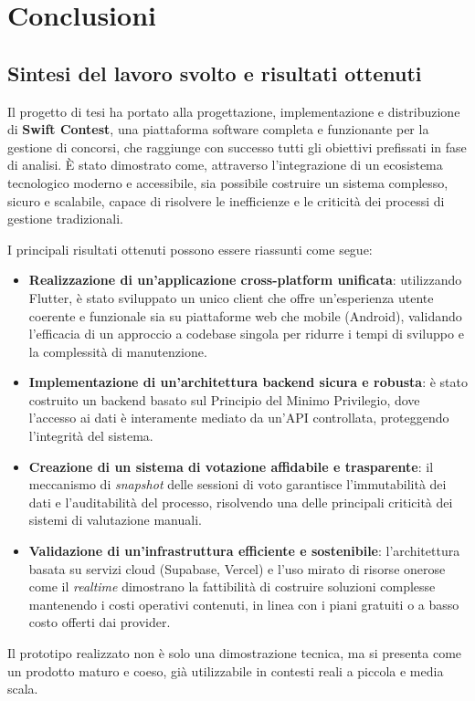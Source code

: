 
\chapter{Conclusioni}\label{ch:conclusioni}


\section{Sintesi del lavoro svolto e risultati ottenuti}\label{sec:sintesi-del-lavoro-svolto-e-risultati-ottenuti}
Il progetto di tesi ha portato alla progettazione, implementazione e distribuzione di \textbf{Swift Contest}, una piattaforma software completa e funzionante per la gestione di concorsi, che raggiunge con successo tutti gli obiettivi prefissati in fase di analisi.
È stato dimostrato come, attraverso l'integrazione di un ecosistema tecnologico moderno e accessibile, sia possibile costruire un sistema complesso, sicuro e scalabile, capace di risolvere le inefficienze e le criticità dei processi di gestione tradizionali.

I principali risultati ottenuti possono essere riassunti come segue:
\begin{itemize}
    \item \textbf{Realizzazione di un'applicazione cross-platform unificata}: utilizzando Flutter, è stato sviluppato un unico client che offre un'esperienza utente coerente e funzionale sia su piattaforme web che mobile (Android), validando l'efficacia di un approccio a codebase singola per ridurre i tempi di sviluppo e la complessità di manutenzione.
    \item \textbf{Implementazione di un'architettura backend sicura e robusta}: è stato costruito un backend basato sul Principio del Minimo Privilegio, dove l'accesso ai dati è interamente mediato da un'API controllata, proteggendo l'integrità del sistema.
    \item \textbf{Creazione di un sistema di votazione affidabile e trasparente}: il meccanismo di \emph{snapshot} delle sessioni di voto garantisce l'immutabilità dei dati e l'auditabilità del processo, risolvendo una delle principali criticità dei sistemi di valutazione manuali.
    \item \textbf{Validazione di un'infrastruttura efficiente e sostenibile}: l'architettura basata su servizi cloud (Supabase, Vercel) e l'uso mirato di risorse onerose come il \emph{realtime} dimostrano la fattibilità di costruire soluzioni complesse mantenendo i costi operativi contenuti, in linea con i piani gratuiti o a basso costo offerti dai provider.
\end{itemize}
Il prototipo realizzato non è solo una dimostrazione tecnica, ma si presenta come un prodotto maturo e coeso, già utilizzabile in contesti reali a piccola e media scala.

